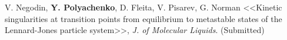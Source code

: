 

\vspace{4mm}

\begin{cvenum}

	\item V. Negodin, \textbf{Y. Polyachenko}, D. Fleita, V. Pisarev, G. Norman <<Kinetic singularities at transition points from equilibrium to metastable states of the Lennard-Jones particle system>>, \textit{J. of Molecular Liquids}. (Submitted)

\end{cvenum}


\vspace{3mm}

